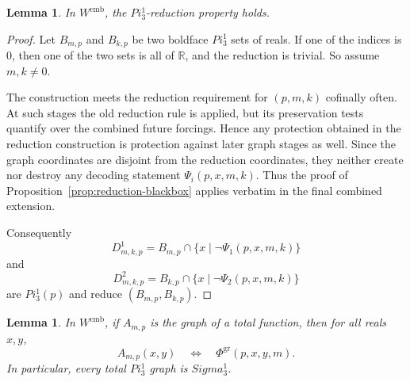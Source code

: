 \documentclass{article}
\newtheorem{lemma}[theorem]{Lemma}
\theoremstyle{remark}
\theoremstyle{plain}
\newcommand{\Real}{\mathbb{R}}
\def\mathbf#1{#1}%
\def\Pi{Pi}%
\def\Sigma{Sigma}%
\begin{document}
\begin{lemma}\label{lem:combined-reduction}
In $W^{\mathrm{cmb}}$, the $\mathbf{\Pi}^1_3$-reduction property holds.
\end{lemma}

\begin{proof}
Let $B_{m,p}$ and $B_{k,p}$ be two boldface $\mathbf{\Pi}^1_3$ sets of reals. If
one of the indices is $0$, then one of the two sets is all of $\Real$, and the
reduction is trivial. So assume $m,k\neq0$.

The construction meets the reduction requirement for $(p,m,k)$ cofinally often.
At such stages the old reduction rule is applied, but its preservation tests
quantify over the combined future forcings. Hence any protection obtained in the
reduction construction is protection against later graph stages as well. Since
the graph coordinates are disjoint from the reduction coordinates, they neither
create nor destroy any decoding statement $\Psi_i(p,x,m,k)$. Thus the proof of
Proposition~\ref{prop:reduction-blackbox} applies verbatim in the final combined
extension.

Consequently
\[
   D^1_{m,k,p}=B_{m,p}\cap\{x\mid\neg\Psi_1(p,x,m,k)\}
\]
and
\[
   D^2_{m,k,p}=B_{k,p}\cap\{x\mid\neg\Psi_2(p,x,m,k)\}
\]
are $\mathbf{\Pi}^1_3(p)$ and reduce $(B_{m,p},B_{k,p})$.
\end{proof}

\begin{lemma}\label{lem:combined-total-graphs}
In $W^{\mathrm{cmb}}$, if $A_{m,p}$ is the graph of a total function, then for
all reals $x,y$,
\[
   A_{m,p}(x,y)
   \quad\Longleftrightarrow\quad
   \Phi^{\mathrm{gr}}(p,x,y,m).
\]
In particular, every total $\mathbf{\Pi}^1_3$ graph is
$\mathbf{\Sigma}^1_3$.
\end{lemma}
\end{document}
